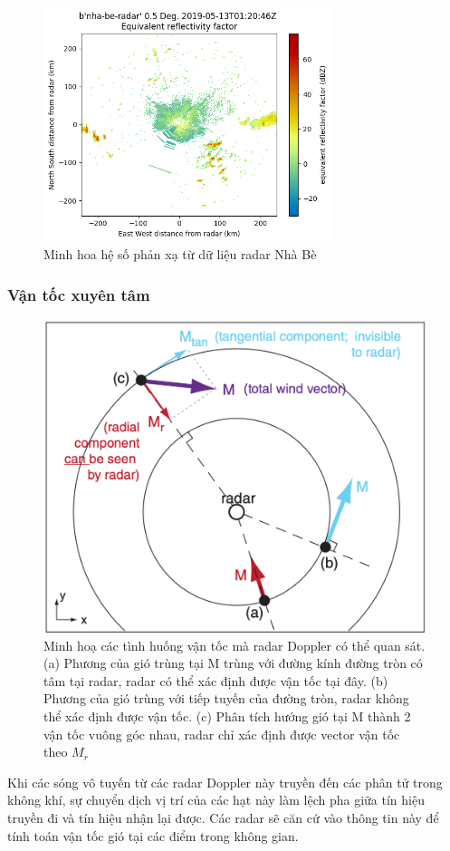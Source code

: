 \begin{figure}[H]
    \centering
    \includegraphics[width=0.75\textwidth]{Images/2.1-reflectivity_nhabe.png}
    \vspace{1em}
    \caption{Minh hoa hệ số phản xạ từ dữ liệu radar Nhà Bè}
    \label{fig:reflectivity-nhabe}
\end{figure}


\subsubsection{Vận tốc xuyên tâm}

\begin{figure}[H]
    \centering
    \includegraphics[width=.55\textwidth]{Images/2.1-radial-velocity.png}
    \vspace{2em}
    \caption{Minh hoạ các tình huống vận tốc mà radar Doppler có thể quan sát. (a) Phương của gió trùng tại M trùng với đường kính đường tròn có tâm tại radar, radar có thể xác định được vận tốc tại đây. (b) Phương của gió trùng với tiếp tuyến của đường tròn, radar không thể xác định được vận tốc. (c) Phân tích hướng gió tại M thành 2 vận tốc vuông góc nhau, radar chỉ xác định được vector vận tốc theo $M_r$}
    \label{fig:radial-velocity}
\end{figure}

Khi các sóng vô tuyến từ các radar Doppler này truyền đến các phân tử trong không khí, sự chuyển dịch vị trí của các hạt này làm lệch pha giữa tín hiệu truyền đi và tín hiệu nhận lại được. Các radar sẽ căn cứ vào thông tin này để tính toán vận tốc gió tại các điểm trong không gian.